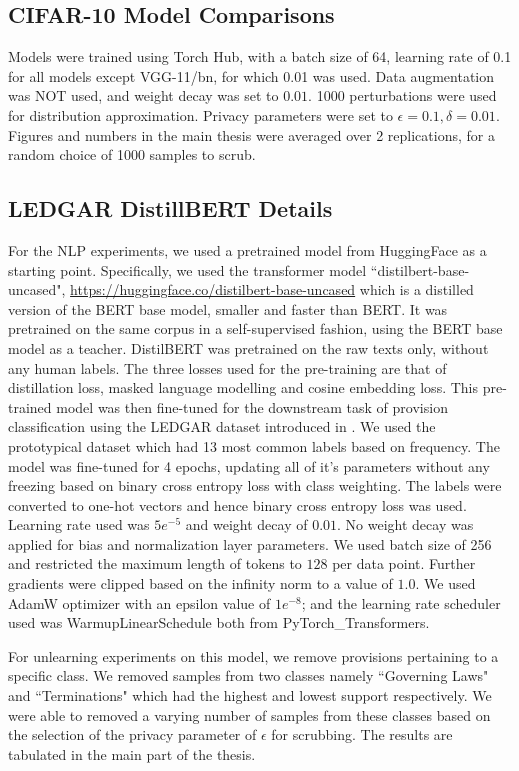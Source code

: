 \subsection{CIFAR-10 Model Comparisons}
Models were trained using Torch Hub, with a batch size of 64, learning rate of 0.1 for all models except VGG-11/bn, for which 0.01 was used. Data augmentation was NOT used, and weight decay was set to $0.01$.
1000 perturbations were used for distribution approximation. Privacy parameters were set to $\epsilon=0.1, \delta=0.01$.
Figures and numbers in the main thesis were averaged over 2 replications, for a random choice of 1000 samples to scrub.

\subsection{LEDGAR DistillBERT Details}
For the NLP experiments, we used a pretrained model from HuggingFace as a starting point. Specifically, we used the transformer model ``distilbert-base-uncased", \url{https://huggingface.co/distilbert-base-uncased} which is a distilled version of the BERT base model, smaller and faster than BERT. It was pretrained on the same corpus in a self-supervised fashion, using the BERT base model as a teacher. DistilBERT \cite{sanh2019distilbert} was pretrained on the raw texts only, without any human labels. The three losses used for the pre-training are that of distillation loss, masked language modelling and cosine embedding loss. This pre-trained model was then fine-tuned for the downstream task of provision classification using the LEDGAR dataset introduced in \citep{tuggener2020ledgar}. We used the prototypical dataset which had 13 most common labels based on frequency. The model was fine-tuned for 4 epochs, updating all of it's parameters without any freezing based on binary cross entropy loss with class weighting. The labels were converted to one-hot vectors and hence binary cross entropy loss was used. Learning rate used was $5e^{-5}$ and weight decay of $0.01$. No weight decay was applied for bias and normalization layer parameters. We used batch size of 256 and restricted the maximum length of tokens to $128$ per data point. Further gradients were clipped based on the infinity norm to a value of $1.0$. We used AdamW optimizer with an epsilon value of $1e^{-8}$; and the learning rate scheduler used was WarmupLinearSchedule both from PyTorch\_Transformers. 

For unlearning experiments on this model, we remove provisions pertaining to a specific class. We removed samples from two classes namely ``Governing Laws" and ``Terminations" which had the highest and lowest support respectively. We were able to removed a varying number of samples from these classes based on the selection of the privacy parameter of $\epsilon$ for scrubbing. The results are tabulated in the main part of the thesis.


